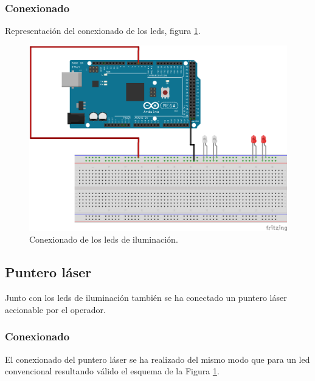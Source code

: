 \subsubsection{Conexionado}

Representación del conexionado de los leds, figura \ref{img:leds_conexiones}.\\

\begin{figure}[H]
  \begin{center}
   \includegraphics[scale=0.5]{imagenes/leds_conexion.png}
  \end{center}
  \caption{Conexionado de los leds de iluminación.}
  \label{img:leds_conexiones}
\end{figure}


\subsection{Puntero láser}

Junto con los leds de iluminación también se ha conectado un puntero láser accionable por el operador.


\subsubsection{Conexionado}

El conexionado del puntero láser se ha realizado del mismo modo que para un led convencional resultando válido el esquema de la Figura \ref{img:leds_conexiones}.\\

